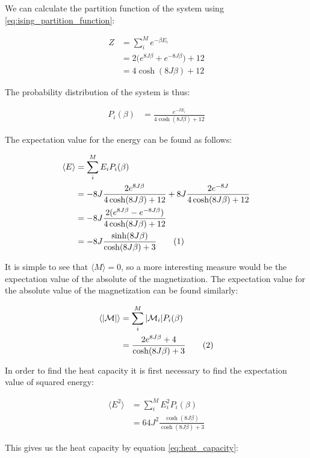 \documentclass[reprint,english,notitlepage]{revtex4-1}  %
\newcommand\numberthis{\addtocounter{equation}{1}\tag{\theequation}}
\begin{document}
We can calculate the partition function of the system using \eqref{eq:ising_partition_function}:

\begin{align*}
Z &= \sum\limits_i^M e^{-\beta E_i} \\
&= 2 \bigg(e^{8J\beta} + e^{-8J\beta} \bigg) + 12 \\
&= 4\cosh(8J\beta) + 12
\end{align*}

The probability distribution of the system is thus:

\begin{align*}
P_i(\beta) &= \frac{e^{-\beta E_i}}{4\cosh (8J\beta) + 12}
\end{align*}

The expectation value for the energy can be found as follows:

\begin{align*}
\langle E \rangle &= \sum\limits_i^M E_i P_i(\beta) \\
 &= -8J \frac{2e^{8J\beta}}{4\cosh (8J\beta) + 12} + 8J \frac{2e^{-8J}}{4\cosh (8J\beta) + 12} \\
 &= -8J\frac{2(e^{8J\beta} - e^{-8J\beta})}{4\cosh (8J\beta) + 12} \\
 &= -8J\frac{\sinh(8J\beta) }{\cosh (8J\beta) + 3} \numberthis \label{eq:2x2_energy}
\end{align*}

It is simple to see that $\langle M \rangle = 0$, so a more interesting measure would be the expectation value of the absolute of the magnetization. The expectation value for the absolute value of the magnetization can be found similarly:

\begin{align*}
\langle |\mathcal{M}| \rangle &= \sum\limits_i^M |\mathcal{M}_i| P_i(\beta) \\
 &= \frac{2e^{8J\beta} + 4}{\cosh (8 J \beta) + 3} \numberthis \label{eq:2x2_abs_magnetization}
\end{align*}

In order to find the heat capacity it is first necessary to find the expectation value of squared energy:

\begin{align*}
\langle E^2 \rangle &= \sum\limits_i^M E_i^2 P_i(\beta) \\
&= 64J^2 \frac{\cosh(8J\beta)}{\cosh(8J\beta) + 3}
\end{align*}

This gives us the heat capacity by equation \eqref{eq:heat_capacity}:
\end{document}
